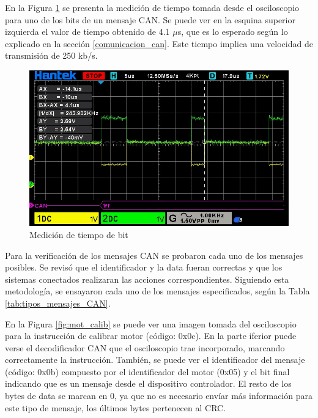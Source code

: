 En la Figura \ref{fig:tiempo_bit_can} se presenta la medición de tiempo tomada desde el osciloscopio para uno de los bits de un mensaje CAN. Se puede ver en la esquina superior izquierda el valor de tiempo obtenido de 4.1 $\mu$s, que es lo esperado según lo explicado en la sección \ref{comunicacion_can}. Este tiempo implica una velocidad de transmisión de 250 kb/s.

\begin{figure}[htbp]
	\centering
	\includegraphics[scale=0.6]{./Figures/bit_time_can.jpeg}
	\caption{Medición de tiempo de bit}
	\label{fig:tiempo_bit_can}
\end{figure}

Para la verificación de los mensajes CAN se probaron cada uno de los mensajes posibles. Se revisó que el identificador y la data fueran correctas y que los sistemas conectados realizaran las acciones correspondientes. Siguiendo esta metodología, se ensayaron cada uno de los mensajes especificados, según la Tabla \ref{tab:tipos_mensajes_CAN}.

En la Figura \ref{fig:mot_calib} se puede ver una imagen tomada del osciloscopio para la instrucción de calibrar motor (código: 0x0c). En la parte iferior puede verse el decodificador CAN que el osciloscopio trae incorporado, marcando correctamente la instrucción. También, se puede ver el identificador del mensaje (código: 0x0b) compuesto por el identificador del motor (0x05) y el bit final indicando que es un mensaje desde el dispositivo controlador. El resto de los bytes de data se marcan en 0, ya que no es necesario envíar más información para este tipo de mensaje, los últimos bytes pertenecen al CRC.

